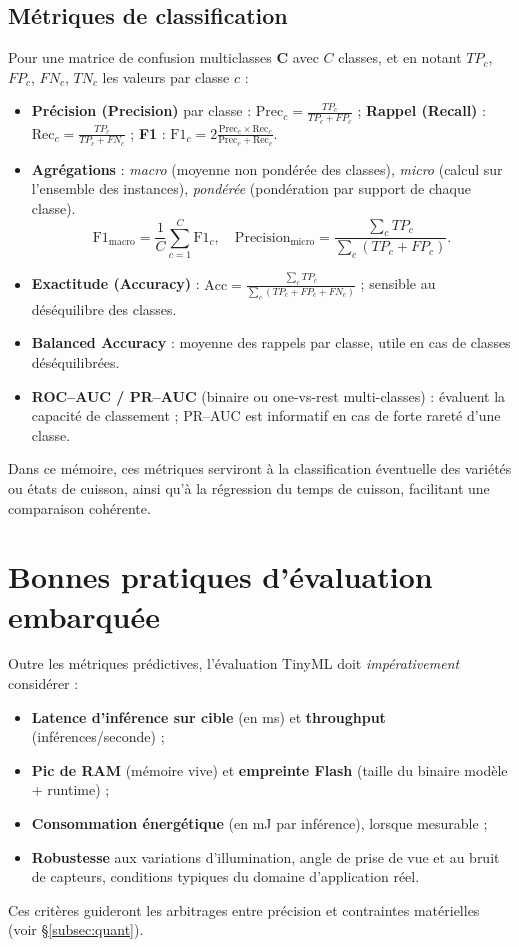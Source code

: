 \subsection{Métriques de classification}
Pour une matrice de confusion multiclasses \(\mathbf{C}\) avec \(C\) classes, et en notant \(TP_c\), \(FP_c\), \(FN_c\), \(TN_c\) les valeurs par classe \(c\) :
\begin{itemize}
    \item \textbf{Précision (Precision)} par classe : \(\mathrm{Prec}_c = \frac{TP_c}{TP_c + FP_c}\) ; \textbf{Rappel (Recall)} : \(\mathrm{Rec}_c = \frac{TP_c}{TP_c + FN_c}\) ; \textbf{F1} : \(\mathrm{F1}_c = 2 \frac{\mathrm{Prec}_c \times \mathrm{Rec}_c}{\mathrm{Prec}_c + \mathrm{Rec}_c}\).
    \item \textbf{Agrégations} : \emph{macro} (moyenne non pondérée des classes), \emph{micro} (calcul sur l’ensemble des instances), \emph{pondérée} (pondération par support de chaque classe).
          \[
              \mathrm{F1}_{\text{macro}} = \frac{1}{C} \sum_{c=1}^C \mathrm{F1}_c, \quad \mathrm{Precision}_{\text{micro}} = \frac{\sum_c TP_c}{\sum_c (TP_c + FP_c)}.
          \]
    \item \textbf{Exactitude (Accuracy)} : \(\mathrm{Acc} = \frac{\sum_c TP_c}{\sum_c (TP_c + FP_c + FN_c)}\) ; sensible au déséquilibre des classes.
    \item \textbf{Balanced Accuracy} : moyenne des rappels par classe, utile en cas de classes déséquilibrées.
    \item \textbf{ROC–AUC / PR–AUC} (binaire ou one-vs-rest multi-classes) : évaluent la capacité de classement ; PR–AUC est informatif en cas de forte rareté d’une classe.
\end{itemize}
Dans ce mémoire, ces métriques serviront à la classification éventuelle des variétés ou états de cuisson, ainsi qu’à la régression du temps de cuisson, facilitant une comparaison cohérente.

\section{Bonnes pratiques d’évaluation embarquée}
Outre les métriques prédictives, l’évaluation TinyML doit \emph{impérativement} considérer :
\begin{itemize}
    \item \textbf{Latence d’inférence sur cible} (en ms) et \textbf{throughput} (inférences/seconde) ;
    \item \textbf{Pic de RAM} (mémoire vive) et \textbf{empreinte Flash} (taille du binaire modèle + runtime) ;
    \item \textbf{Consommation énergétique} (en mJ par inférence), lorsque mesurable ;
    \item \textbf{Robustesse} aux variations d’illumination, angle de prise de vue et au bruit de capteurs, conditions typiques du domaine d’application réel.
\end{itemize}
Ces critères guideront les arbitrages entre précision et contraintes matérielles (voir \S\ref{subsec:quant}).

